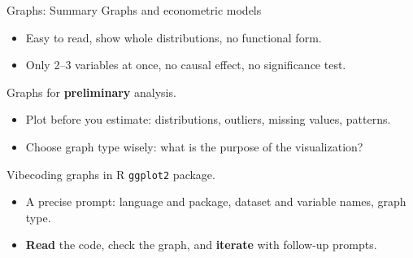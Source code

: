 \documentclass[9pt,aspectratio=169]{beamer}
\begin{document}
\begin{frame}{Graphs: Summary}
Graphs and econometric models
\begin{itemize}
    \item[+] Easy to read, show whole distributions, no functional form.
    \item[--] Only 2--3 variables at once, no causal effect, no significance test.
  \end{itemize}
\pause
Graphs for \textbf{preliminary} analysis.
\begin{itemize}
    \item Plot before you estimate: distributions, outliers, missing values, patterns.
    \item Choose graph type wisely: what is the purpose of the visualization?
  \end{itemize}
\pause
Vibecoding graphs in R \texttt{ggplot2} package.
\begin{itemize}
    \item A precise prompt: language and package, dataset and variable names, graph type.
    \item \textbf{Read} the code, check the graph, and \textbf{iterate} with follow-up prompts.
\end{itemize}
\end{frame}
\end{document}
